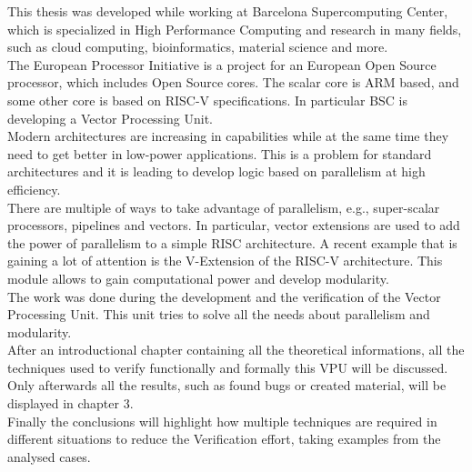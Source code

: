\summary
\english

This thesis was developed while working at Barcelona Supercomputing Center, which is specialized in High Performance Computing and research in many fields, such as cloud computing, bioinformatics, material science and more.\\

The European Processor Initiative is a project for an European Open Source processor, which includes Open Source cores. The scalar core is ARM based, and some other core is based on RISC-V specifications. In particular BSC is developing a Vector Processing Unit.\\
 
Modern architectures are increasing in capabilities while at the same time they need to get better in low-power applications.
This  is a problem for standard architectures and it is leading to develop logic based on parallelism at high efficiency.\\

There are multiple of ways to take advantage of parallelism, e.g., super-scalar processors, pipelines and vectors. In particular, vector extensions are used to add the power of parallelism to a simple RISC architecture. A recent example that is gaining a lot of attention is the V-Extension of the RISC-V architecture. This module allows to gain computational power and develop modularity.\\

The work was done during the development and the verification of the Vector Processing Unit. This unit tries to solve all the needs about parallelism and modularity.\\

After an introductional chapter containing all the theoretical informations, all the techniques used to verify functionally and formally this VPU will be discussed.\\
Only afterwards all the results, such as found bugs or created material, will be displayed in chapter 3.\\

Finally the conclusions will highlight how multiple techniques are required in different situations to reduce the Verification effort, taking examples from the analysed cases.








\bigskip

